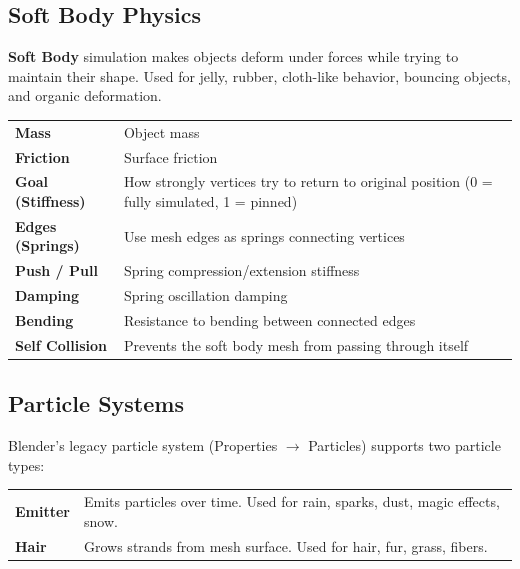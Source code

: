 \subsection{Soft Body Physics}
\label{subsec:soft-body}

\textbf{Soft Body} simulation makes objects deform under forces while trying to maintain their shape. Used for jelly, rubber, cloth-like behavior, bouncing objects, and organic deformation.

\begin{center}
\begin{tabularx}{\textwidth}{L{3cm}X}
\toprule
{}
 &  \\
\midrule
\textbf{Mass} & Object mass \\
\textbf{Friction} & Surface friction \\
\textbf{Goal (Stiffness)} & How strongly vertices try to return to original position (0 = fully simulated, 1 = pinned) \\
\textbf{Edges (Springs)} & Use mesh edges as springs connecting vertices \\
\textbf{Push / Pull} & Spring compression/extension stiffness \\
\textbf{Damping} & Spring oscillation damping \\
\textbf{Bending} & Resistance to bending between connected edges \\
\textbf{Self Collision} & Prevents the soft body mesh from passing through itself \\
\bottomrule
\end{tabularx}
\end{center}

\subsection{Particle Systems}
\label{subsec:particles}

Blender's legacy particle system (Properties $\rightarrow$ Particles) supports two particle types:

\begin{center}
\begin{tabularx}{\textwidth}{L{2cm}X}
\toprule
{}
 &  \\
\midrule
\textbf{Emitter} & Emits particles over time. Used for rain, sparks, dust, magic effects, snow. \\
\textbf{Hair} & Grows strands from mesh surface. Used for hair, fur, grass, fibers. \\
\bottomrule
\end{tabularx}
\end{center}

